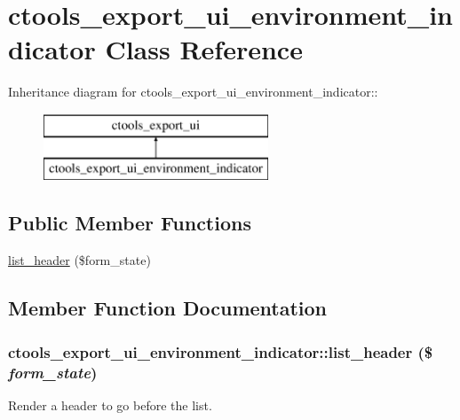 \hypertarget{classctools__export__ui__environment__indicator}{
\section{ctools\_\-export\_\-ui\_\-environment\_\-indicator Class Reference}
\label{classctools__export__ui__environment__indicator}
}
Inheritance diagram for ctools\_\-export\_\-ui\_\-environment\_\-indicator::\begin{figure}[H]
\begin{center}
\leavevmode
\includegraphics[height=2cm]{classctools__export__ui__environment__indicator}
\end{center}
\end{figure}
\subsection*{Public Member Functions}
\begin{DoxyCompactItemize}
\item 
\hyperlink{classctools__export__ui__environment__indicator_a59040bf692c3ed762acc456af90ecdfb}{list\_\-header} (\$form\_\-state)
\end{DoxyCompactItemize}


\subsection{Member Function Documentation}
\hypertarget{classctools__export__ui__environment__indicator_a59040bf692c3ed762acc456af90ecdfb}{
\subsubsection[{list\_\-header}]{\setlength{\rightskip}{0pt plus 5cm}ctools\_\-export\_\-ui\_\-environment\_\-indicator::list\_\-header (\$ {\em form\_\-state})}}
\label{classctools__export__ui__environment__indicator_a59040bf692c3ed762acc456af90ecdfb}
Render a header to go before the list.

